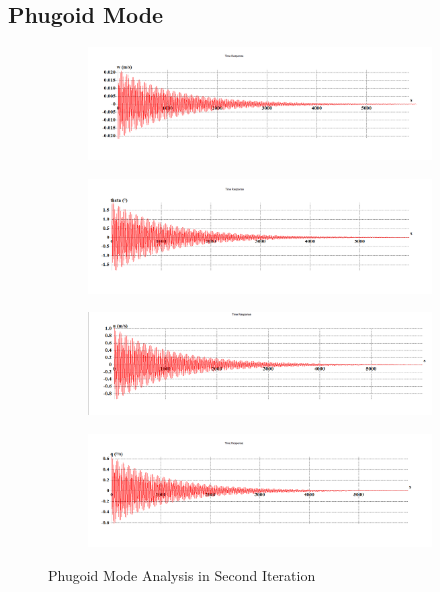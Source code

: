 \subsection{Phugoid Mode}
\begin{figure}[H]
\begin{subfigure}{0.48\textwidth}
\includegraphics[width = \linewidth]{w__3_.png}
\end{subfigure}
\begin{subfigure}{0.48\textwidth}
\includegraphics[width = \linewidth]{theta__3_.png}
\end{subfigure}
\medskip
\begin{subfigure}{0.48\textwidth}
\includegraphics[width = \linewidth]{u__3_.png}
\end{subfigure}
\begin{subfigure}{0.48\textwidth}
\includegraphics[width = \linewidth]{q__3_.png}
\end{subfigure}
\caption{Phugoid Mode Analysis in Second Iteration}
\end{figure}
